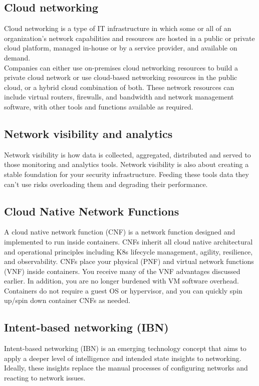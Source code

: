 \documentclass[10pt,a4paper]{article}
\begin{document}
\subsection{Cloud networking}
\justifying
Cloud networking is a type of IT infrastructure in which some or all of an organization’s network capabilities and resources are hosted in a public or private cloud platform, managed in-house or by a service provider, and available on demand.\\
Companies can either use on-premises cloud networking resources to build a private cloud network or use cloud-based networking resources in the public cloud, or a hybrid cloud combination of both. These network resources can include virtual routers, firewalls, and bandwidth and network management software, with other tools and functions available as required. 
\subsection{Network visibility and analytics}
\justifying
Network visibility is how data is collected, aggregated, distributed and served to those monitoring and analytics tools. Network visibility is also about creating a stable foundation for your security infrastructure. Feeding these tools data they can’t use risks overloading them and degrading their performance.
\subsection{Cloud Native Network Functions}
\justifying
A cloud native network function (CNF) is a network function designed and implemented to run inside containers. CNFs inherit all cloud native architectural and operational principles including K8s lifecycle management, agility, resilience, and observability. CNFs place your physical (PNF) and virtual network functions (VNF) inside containers. You receive many of the VNF advantages discussed earlier. In addition, you are no longer burdened with VM software overhead. Containers do not require a guest OS or hypervisor, and you can quickly spin up/spin down container CNFs as needed.
\subsection{Intent-based networking (IBN)}
\justifying
Intent-based networking (IBN) is an emerging technology concept that aims to apply a deeper level of intelligence and intended state insights to networking. Ideally, these insights replace the manual processes of configuring networks and reacting to network issues.
\end{document}
